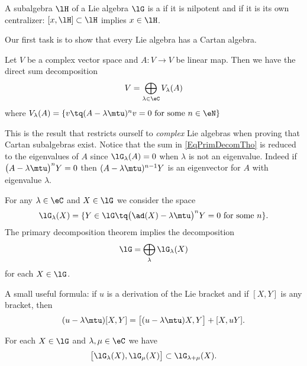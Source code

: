 \begin{definition}      \label{DEFooUNWJooVsBZgJ}
A subalgebra $\lH$ of a Lie algebra $\lG$ is a  if it is nilpotent and if it is its own centralizer: $[x,\lH]\subset\lH$ implies $x\in\lH$.
\end{definition}

Our first task is to show that every Lie algebra has a Cartan algebra.

\begin{lemma}
    Let \( V\) be a complex vector space and \( A\colon V\to V\) be linear map. Then we have the direct sum decomposition
    \begin{equation}        \label{EqPrimDecomTho}
        V=\bigoplus_{\lambda\in\eC}V_{\lambda}(A)
    \end{equation}
    where \( V_{\lambda}(A)=\{ v\tq (A-\lambda\mtu)^nv=0\text{ for some } n\in\eN \} \)
\end{lemma}
This is the result that restricts ourself to \emph{complex} Lie algebras when proving that Cartan subalgebras exist. Notice that the sum in \eqref{EqPrimDecomTho} is reduced to the eigenvalues of \( A\) since \( \lG_{\lambda}(A)=0\) when \( \lambda\) is not an eigenvalue. Indeed if \( \big( A-\lambda\mtu \big)^nY=0\) then \( (A-\lambda\mtu)^{n-1}Y\) is an eigenvector for \( A\) with eigenvalue \( \lambda\).

For any \( \lambda\in\eC\) and \( X\in\lG\) we consider the space
\begin{equation}
    \lG_{\lambda}(X)=\{ Y\in\lG\tq \big( \ad(X)-\lambda\mtu \big)^nY=0\text{ for some } n \}.
\end{equation}
The primary decomposition theorem implies the decomposition
\begin{equation}        \label{EqDecomplGpRimDecombijk}
    \lG=\bigoplus_{\lambda}\lG_{\lambda}(X)
\end{equation}
for each \( X\in\lG\).

A small useful formula: if \( u\) is a derivation of the Lie bracket and if \( [X,Y]\) is any bracket, then
\begin{equation}\label{EqWGujmeF}
    (u-\lambda\mtu)[X,Y]=\big[ (u-\lambda\mtu)X,Y \big]+[X,uY].
\end{equation}

\begin{lemma}   \label{LemVZzSnUW}
    For each \( X\in\lG\) and \( \lambda,\mu\in\eC\) we have
    \begin{equation}
        \big[ \lG_{\lambda}(X),\lG_{\mu}(X) \big]\subset\lG_{\lambda+\mu}(X).
    \end{equation}
\end{lemma}

